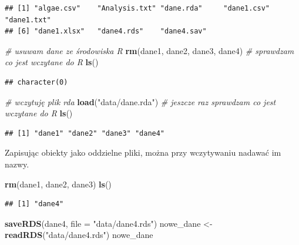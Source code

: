 \documentclass[
]{book}
\newenvironment{Shaded}{\begin{snugshade}}{\end{snugshade}}
\newcommand{\CommentTok}[1]{\textcolor[rgb]{0.56,0.35,0.01}{\textit{#1}}}
\newcommand{\DataTypeTok}[1]{\textcolor[rgb]{0.13,0.29,0.53}{#1}}
\newcommand{\KeywordTok}[1]{\textcolor[rgb]{0.13,0.29,0.53}{\textbf{#1}}}
\newcommand{\NormalTok}[1]{#1}
\newcommand{\StringTok}[1]{\textcolor[rgb]{0.31,0.60,0.02}{#1}}
\theoremstyle{plain}
\theoremstyle{definition}
\theoremstyle{definition}
\theoremstyle{definition}
\theoremstyle{definition}
\theoremstyle{remark}
\begin{document}
\begin{verbatim}
## [1] "algae.csv"    "Analysis.txt" "dane.rda"     "dane1.csv"    "dane1.txt"   
## [6] "dane1.xlsx"   "dane4.rds"    "dane4.sav"
\end{verbatim}

\begin{Shaded}
\begin{Highlighting}[]
\CommentTok{# usuwam dane ze środowiska R}
\KeywordTok{rm}\NormalTok{(dane1, dane2, dane3, dane4)}
\CommentTok{# sprawdzam co jest wczytane do R}
\KeywordTok{ls}\NormalTok{()}
\end{Highlighting}
\end{Shaded}

\begin{verbatim}
## character(0)
\end{verbatim}

\begin{Shaded}
\begin{Highlighting}[]
\CommentTok{# wczytuję plik rda}
\KeywordTok{load}\NormalTok{(}\StringTok{"data/dane.rda"}\NormalTok{)}
\CommentTok{# jeszcze raz sprawdzam co jest wczytane do R}
\KeywordTok{ls}\NormalTok{()}
\end{Highlighting}
\end{Shaded}

\begin{verbatim}
## [1] "dane1" "dane2" "dane3" "dane4"
\end{verbatim}

Zapisując obiekty jako oddzielne pliki, można przy wczytywaniu nadawać im nazwy.

\begin{Shaded}
\begin{Highlighting}[]
\KeywordTok{rm}\NormalTok{(dane1, dane2, dane3)}
\KeywordTok{ls}\NormalTok{()}
\end{Highlighting}
\end{Shaded}

\begin{verbatim}
## [1] "dane4"
\end{verbatim}

\begin{Shaded}
\begin{Highlighting}[]
\KeywordTok{saveRDS}\NormalTok{(dane4, }\DataTypeTok{file =} \StringTok{"data/dane4.rds"}\NormalTok{)}
\NormalTok{nowe_dane <-}\StringTok{ }\KeywordTok{readRDS}\NormalTok{(}\StringTok{"data/dane4.rds"}\NormalTok{)}
\NormalTok{nowe_dane}
\end{Highlighting}
\end{Shaded}
\end{document}
